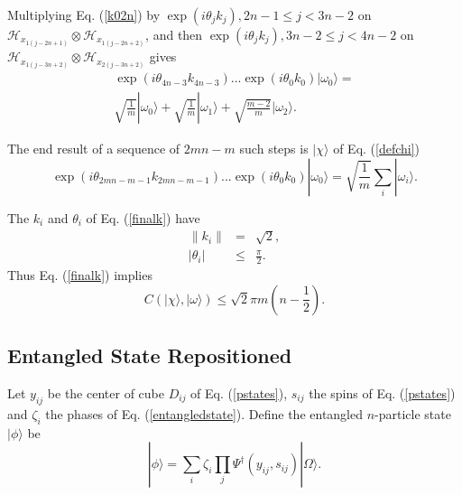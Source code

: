 \documentclass[12pt,amsmath,amssymb,onecolumn]{revtex4-2}
\begin{document}
Multiplying Eq. (\ref{k02n}) by $\exp(i\theta_jk_j), 2n-1 \le j < 3n-2$ on
$\mathcal{H}_{x_{1(j-2n+1)}} \otimes \mathcal{H}_{x_{1(j-2n +2)}}$, 
and then $\exp(i\theta_jk_j), 3n -2 \le j < 4n -2$ on
$\mathcal{H}_{x_{1(j-3n+2)}} \otimes \mathcal{H}_{x_{2(j-3n+2)}}$ gives
\begin{multline}
\label{k04n}
\exp( i \theta_{4n-3} k_{4n-3}) ... \exp( i \theta_0 k_0) |\omega_0 \rangle  = \\
\sqrt{\frac{1}{m}} |\omega_0 \rangle  +
\sqrt{\frac{1}{m}} |\omega_1 \rangle  + 
\sqrt{\frac{m - 2}{m}} |\omega_2 \rangle .
\end{multline}

The end result of a sequence of $2mn - m$ such steps is
$|\chi \rangle $ of Eq. (\ref{defchi})
\begin{equation}
\label{finalk}
\exp( i \theta_{2mn-m-1} k_{2mn-m-1}) ... \exp( i \theta_0 k_0) |\omega_0 \rangle  =
\sqrt{\frac{1}{m}} \sum_i |\omega_i \rangle .
\end{equation}

The $k_i$ and $\theta_i$ of Eq. (\ref{finalk}) have
\begin{subequations}
\begin{eqnarray}
\label{normfinalk}
\parallel k_i \parallel & = & \sqrt{2},\\
\label{normfinaltheta}
| \theta_i | & \le & \frac{\pi}{2}.
\end{eqnarray}
\end{subequations}
Thus  Eq. (\ref{finalk}) implies
\begin{equation}
\label{deltac}
C( |\chi \rangle , |\omega \rangle ) \le \sqrt{2} \pi m (n - \frac{1}{2}).
\end{equation}


\subsection{\label{app:subsectionsecond}Entangled State Repositioned}

Let $y_{ij}$ be the center of cube $D_{ij}$ of Eq. (\ref{pstates}), $s_{ij}$ the spins of Eq. (\ref{pstates})
and $\zeta_i$ the phases of Eq. (\ref{entangledstate}). Define the entangled $n$-particle state
$|\phi \rangle $ be
\begin{equation}
\label{phinpoints}
|\phi \rangle  = \sum_{i} \zeta_i \prod_j \Psi^{\dagger}( y_{ij}, s_{ij}) |\Omega \rangle .
\end{equation}
\end{document}
